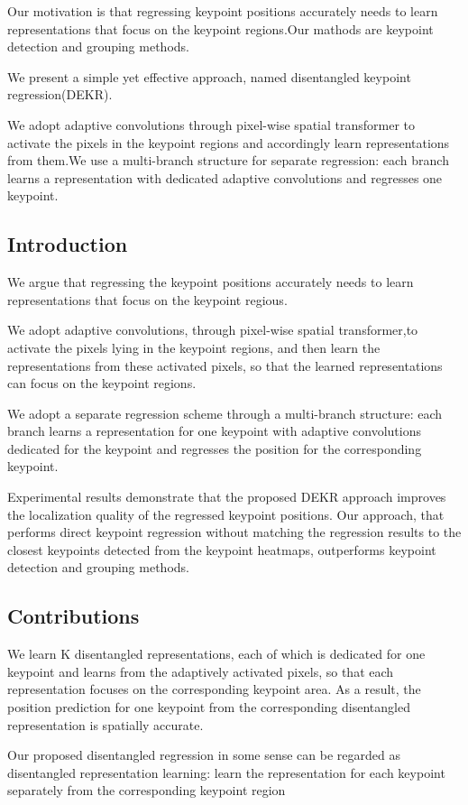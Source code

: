 \documentclass[11pt]{article}
\begin{document}
Our motivation is that regressing keypoint positions accurately needs to learn representations that focus on the keypoint regions.Our mathods are keypoint detection and grouping methods.

We present a simple yet effective approach, named disentangled keypoint regression(DEKR).

We adopt adaptive convolutions through pixel-wise spatial transformer to activate the pixels in the keypoint regions and accordingly learn representations from them.We use a multi-branch structure for separate regression: each branch learns a representation with dedicated adaptive convolutions and regresses one keypoint.
\subsection{Introduction}
We argue that regressing the keypoint positions accurately needs to learn representations that focus on the keypoint regious.

We adopt adaptive convolutions, through pixel-wise spatial transformer,to activate the pixels lying in the keypoint regions, and then learn the representations from these activated pixels, so that
the learned representations can focus on the keypoint regions.

We adopt a separate regression scheme through a multi-branch structure: each branch learns a representation for one keypoint with adaptive convolutions dedicated for the keypoint and regresses the position for the corresponding keypoint.

Experimental results demonstrate that the proposed DEKR approach improves the localization quality of the regressed keypoint positions. Our approach, that performs direct keypoint regression without matching the regression results to the closest keypoints detected from the keypoint heatmaps, outperforms keypoint detection and grouping  methods.
\subsection{Contributions}
We learn K disentangled representations, each of which is dedicated for one keypoint and learns from the adaptively activated pixels, so that each representation focuses on the corresponding keypoint area. As a result, the position prediction for one keypoint from the corresponding disentangled
representation is spatially accurate.

Our proposed disentangled regression in some sense can be regarded as disentangled representation learning: learn the representation for each keypoint separately from the corresponding keypoint region
\end{document}
